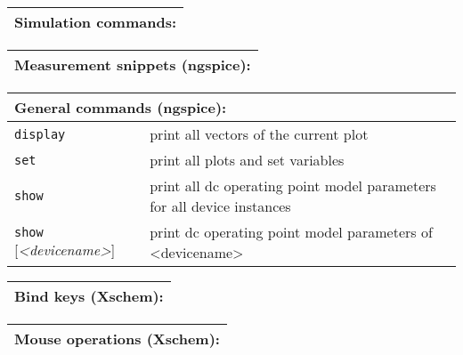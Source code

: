 \documentclass[10pt,a4paper]{article}
\newcommand{\mac}[1]{\texttt{#1}}
\newcommand{\argu}[1]{\textit{#1}}
\begin{document}
	\newpage
	
	\begin{tabular}{p{}p{}}
		\toprule
		\multicolumn{2}{l}{Simulation commands:}\\
		\midrule
		
		\bottomrule
	\end{tabular}
	
	\newpage
	
	\begin{tabular}{p{}p{}}
		\toprule
		\multicolumn{2}{l}{Measurement snippets (ngspice):}\\
		\midrule
		
		\bottomrule
	\end{tabular}
	
	\newpage
	
	\begin{tabular}{p{}p{}}
		\toprule
		\multicolumn{2}{l}{General commands (ngspice):}\\
		\midrule
		\mac{display} & print all vectors of the current plot\\
		\mac{set}	& print all plots and set variables\\
		\mac{show} & print all dc operating point model parameters for all device instances\\
		\mac{show} [\argu{<devicename>}] & print dc operating point model parameters of <devicename>\\
		\bottomrule
	\end{tabular}
	
	\newpage
	
	\begin{tabular}{p{}p{}}
		\toprule
		\multicolumn{2}{l}{Bind keys (Xschem):}\\
		\midrule
		\bottomrule
	\end{tabular}
	
	\newpage
	
	\begin{tabular}{p{}p{}}
		\toprule
		\multicolumn{2}{l}{Mouse operations (Xschem):}\\
		\midrule
		\bottomrule
	\end{tabular}
\end{document}
